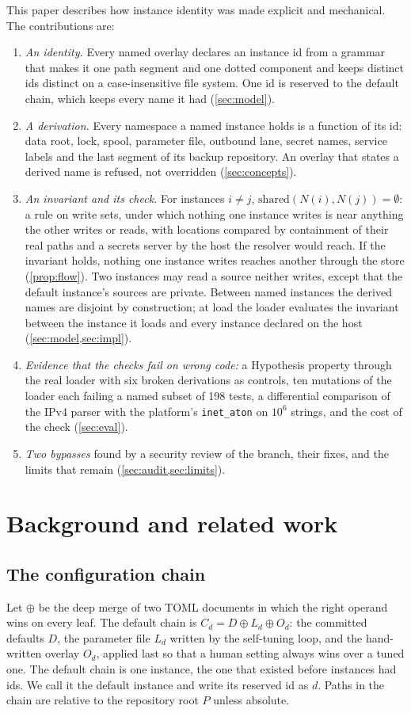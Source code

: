 \documentclass[11pt]{article}
\theoremstyle{plain}
\theoremstyle{definition}
\theoremstyle{remark}
\newcommand{\shared}{\mathrm{shared}}
\begin{document}
This paper describes how instance identity was made explicit and mechanical. The contributions are:
\begin{enumerate}
\item \emph{An identity.} Every named overlay declares an instance id from a grammar that makes it
  one path segment and one dotted component and keeps distinct ids distinct on a case-insensitive
  file system. One id is reserved to the default chain, which keeps every name it had
  (\cref{sec:model}).
\item \emph{A derivation.} Every namespace a named instance holds is a function of its id: data
  root, lock, spool, parameter file, outbound lane, secret names, service labels and the last
  segment of its backup repository. An overlay that states a derived name is refused, not
  overridden (\cref{sec:concepts}).
\item \emph{An invariant and its check.} For instances $i \neq j$, $\shared(N(i), N(j)) =
  \emptyset$: a rule on write sets, under which nothing one instance writes is near anything the
  other writes or reads, with locations compared by containment of their real paths and a secrets
  server by the host the resolver would reach. If the invariant holds, nothing one instance writes
  reaches another through the store (\cref{prop:flow}). Two instances may read a source neither
  writes, except that the default instance's sources are private. Between named instances the
  derived names are disjoint by construction; at load the loader evaluates the invariant between
  the instance it loads and every instance declared on the host (\cref{sec:model,sec:impl}).
\item \emph{Evidence that the checks fail on wrong code:} a Hypothesis property through the real
  loader with six broken derivations as controls, ten mutations of the loader each failing a named
  subset of 198 tests, a differential comparison of the IPv4 parser with the platform's
  \texttt{inet\_aton} on $10^6$ strings, and the cost of the check (\cref{sec:eval}).
\item \emph{Two bypasses} found by a security review of the branch, their fixes, and the limits
  that remain (\cref{sec:audit,sec:limits}).
\end{enumerate}

\section{Background and related work}

\subsection{The configuration chain}
Let $\oplus$ be the deep merge of two TOML documents in which the right operand wins on every leaf.
The default chain is $C_d = D \oplus L_d \oplus O_d$: the committed defaults $D$, the parameter file
$L_d$ written by the self-tuning loop, and the hand-written overlay $O_d$, applied last so that a
human setting always wins over a tuned one. The default chain is one instance, the one that existed
before instances had ids. We call it the default instance and write its reserved id as $d$. Paths
in the chain are relative to the repository root $P$ unless absolute.
\end{document}
